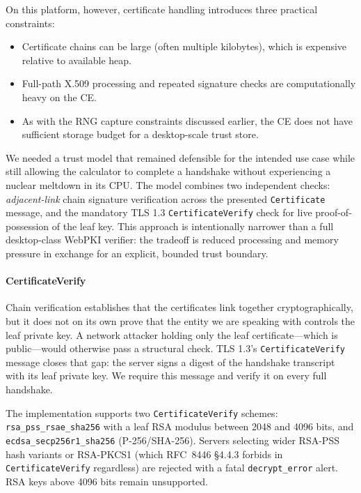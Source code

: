 \documentclass[titlepage]{report}
\begin{document}
	On this platform, however, certificate handling introduces three practical constraints:
	\begin{itemize}
		\item Certificate chains can be large (often multiple kilobytes), which is expensive relative to available heap.
		\item Full-path X.509 processing and repeated signature checks are computationally heavy on the CE.
		\item As with the RNG capture constraints discussed earlier, the CE does not have sufficient storage budget for a desktop-scale trust store.
	\end{itemize}
	We needed a trust model that remained defensible for the intended use case while still allowing the calculator to complete a handshake without experiencing a nuclear meltdown in its CPU. The model combines two independent checks: \emph{adjacent-link} chain signature verification across the presented \texttt{Certificate} message, and the mandatory TLS 1.3 \texttt{CertificateVerify} check for live proof-of-possession of the leaf key. This approach is intentionally narrower than a full desktop-class WebPKI verifier: the tradeoff is reduced processing and memory pressure in exchange for an explicit, bounded trust boundary.

	\paragraph{CertificateVerify}
	Chain verification establishes that the certificates link together cryptographically, but it does not on its own prove that the entity we are speaking with controls the leaf private key. A network attacker holding only the leaf certificate---which is public---would otherwise pass a structural check. TLS 1.3's \texttt{CertificateVerify} message closes that gap: the server signs a digest of the handshake transcript with its leaf private key. We require this message and verify it on every full handshake.

	The implementation supports two \texttt{CertificateVerify} schemes: \texttt{rsa\_pss\_rsae\_sha256} with a leaf RSA modulus between 2048 and 4096 bits, and \texttt{ecdsa\_secp256r1\_sha256} (P-256/SHA-256). Servers selecting wider RSA-PSS hash variants or RSA-PKCS1 (which RFC~8446 §4.4.3 forbids in \texttt{CertificateVerify} regardless) are rejected with a fatal \texttt{decrypt\_error} alert. RSA keys above 4096 bits remain unsupported.
\end{document}
